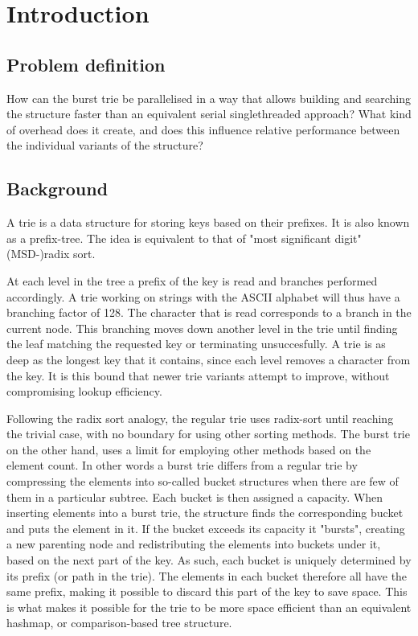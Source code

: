 \chapter{Introduction}

\section{Problem definition}
How can the burst trie be parallelised in a way that allows building and searching
the structure faster than an equivalent serial singlethreaded approach?
What kind of overhead does it create, and does this influence relative
performance between the individual variants of the structure?


\section{Background}
A trie is a data structure for storing keys based on their prefixes.
It is also known as a prefix-tree. The idea is equivalent to that of
"most significant digit" (MSD-)radix sort.

At each level in the tree a prefix of the key is read and branches performed
accordingly. A trie working on strings with the ASCII alphabet will thus have a
branching factor of 128. The character that is read corresponds to a branch in
the current node. This branching moves down another level in the trie until
finding the leaf matching the requested key or terminating unsuccesfully. A
trie is as deep as the longest key that it contains, since each level removes a
character from the key. It is this bound that newer trie variants attempt to
improve, without compromising lookup efficiency.

Following the radix sort analogy, the regular trie uses radix-sort until
reaching the trivial case, with no boundary for using other sorting methods.
The burst trie on the other hand, uses a limit for employing other methods
based on the element count. In other words a burst trie differs from a regular
trie by compressing the elements into so-called bucket structures when
there are few of them in a particular subtree. Each bucket is then assigned a
capacity. When inserting elements into a burst trie, the structure finds the
corresponding bucket and puts the element in it. If the bucket exceeds its
capacity it "bursts", creating a new parenting node and redistributing the
elements into buckets under it, based on the next part of the key. As such,
each bucket is uniquely determined by its prefix (or path in the trie). The
elements in each bucket therefore all have the same prefix, making it possible
to discard this part of the key to save space. This is what makes it possible
for the trie to be more space efficient than an equivalent hashmap, or
    comparison-based tree structure.

